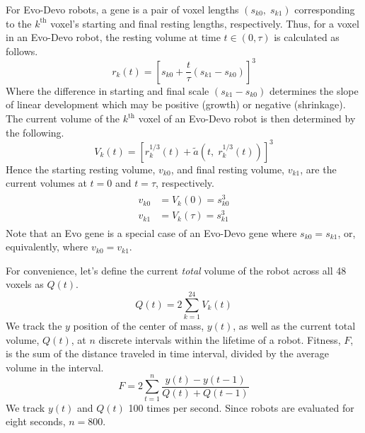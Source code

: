 For Evo-Devo robots, a gene is a pair of voxel lengths $(s_{k0}, \; s_{k1})$ corresponding to the $k^{\text{th}}$ voxel's starting and final resting lengths, respectively. Thus, for a voxel in an Evo-Devo robot, the resting volume at time $t \in (0,\tau)$ is calculated as follows. 
\begin{equation} 
r_k(t)=\left[s_{k0} + \frac{t}{\tau} (s_{k1}-s_{k0})\right]^3
\end{equation}
Where the difference in starting and final scale $(s_{k1}-s_{k0})$ determines the slope of linear development which may be positive (growth) or negative (shrinkage). 
The current volume of the $k^{\text{th}}$ voxel of an Evo-Devo robot is then determined by the following.
\begin{equation}
V_k(t)=\left[ r_k^{1/3}(t) + \tilde{a}\left(t, \; r_k^{1/3}(t)\right)\right]^3
\end{equation}
Hence the starting resting volume, $v_{k0}$, and final resting volume, $v_{k1}$, are the current volumes at $t=0$ and $t=\tau$, respectively.
\begin{align}
\begin{split}
v_{k0} &= V_k(0) =  s_{k0} ^3 \\
v_{k1} &= V_k(\tau) = s_{k1} ^3
\end{split}
\end{align}
Note that an Evo gene is a special case of an Evo-Devo gene where $s_{k0}=s_{k1}$, or, equivalently, where $v_{k0}=v_{k1}$.

For convenience, let's define the current \textit{total} volume of the robot across all 48 voxels as $Q(t)$.
\begin{equation}
Q(t)=2\sum_{k=1}^{24} V_k(t)
\end{equation}
We track the $y$ position of the center of mass, $y(t)$, as well as the current total volume, $Q(t)$, at $n$ discrete intervals within the lifetime of a robot. Fitness, $F$, is the sum of the distance traveled in time interval, divided by the average volume in the interval.
\begin{equation} \label{eq:fitness}
F = 2 \sum_{t=1}^{n} \frac{y(t)-y(t-1)}{Q(t) + Q(t-1)}
\end{equation}
We track $y(t)$ and $Q(t)$ 100 times per second. Since robots are evaluated for eight seconds, $n=800$.


